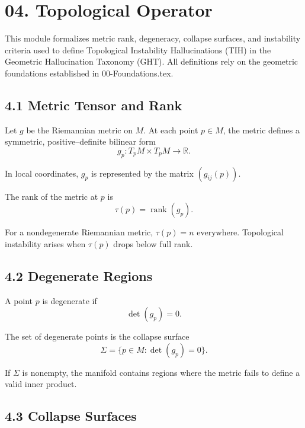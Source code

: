 
\section*{04. Topological Operator}

This module formalizes metric rank, degeneracy, collapse surfaces, and
instability criteria used to define Topological Instability Hallucinations
(TIH) in the Geometric Hallucination Taxonomy (GHT). All definitions rely
on the geometric foundations established in 00-Foundations.tex.

\subsection*{4.1 Metric Tensor and Rank}

Let $g$ be the Riemannian metric on $M$. At each point $p \in M$, the
metric defines a symmetric, positive–definite bilinear form
\[
g_p : T_p M \times T_p M \to \mathbb{R}.
\]

In local coordinates, $g_p$ is represented by the matrix $(g_{ij}(p))$.

The rank of the metric at $p$ is
\[
\tau(p) = \operatorname{rank}(g_p).
\]

For a nondegenerate Riemannian metric, $\tau(p) = n$ everywhere.  
Topological instability arises when $\tau(p)$ drops below full rank.

\subsection*{4.2 Degenerate Regions}

A point $p$ is degenerate if
\[
\det(g_p) = 0.
\]

The set of degenerate points is the collapse surface
\[
\Sigma = \{ p \in M : \det(g_p) = 0 \}.
\]

If $\Sigma$ is nonempty, the manifold contains regions where the metric
fails to define a valid inner product.

\subsection*{4.3 Collapse Surfaces}

